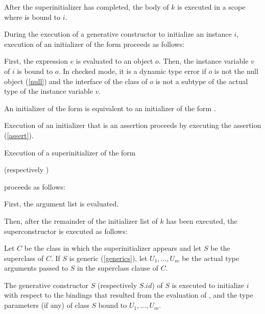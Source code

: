 \documentclass{article}
\begin{document}
\LMHash{}
After the superinitializer has completed, the body of $k$ is executed in a scope where \THIS{} is bound to $i$.


\LMHash{}
During the execution of a generative constructor to initialize an instance $i$,
execution of an initializer of the form 
proceeds as follows:

\LMHash{}
First, the expression $e$ is evaluated to an object $o$.
Then, the instance variable $v$ of $i$ is bound to $o$.
In checked mode, it is a dynamic type error if $o$ is not the null object (\ref{null}) and the interface of the class of $o$ is not a subtype of the actual type of the instance variable $v$.

\LMHash{}
An initializer of the form  is equivalent to an initializer of the form .

\LMHash{}
Execution of an initializer that is an assertion proceeds by executing the assertion (\ref{assert}).

\LMHash{}
Execution of a superinitializer of the form


(respectively
)

proceeds as follows:

\LMHash{}
First, the argument list
is evaluated.

\LMHash{}
Then, after the remainder of the initializer list of $k$ has been executed,
the superconstructor is executed as follows:

\LMHash{}
Let $C$ be the class in which the superinitializer appears and let $S$ be the superclass of $C$.
If $S$ is generic (\ref{generics}), let $U_1, \ldots, U_m$ be the actual type arguments passed to $S$ in the superclass clause of $C$.

\LMHash{}
The generative constructor $S$ (respectively $S.id$) of $S$ is executed
to initialize $i$ with respect to the bindings that resulted from the evaluation of
,
and the type parameters (if any) of class $S$ bound to $U_1, \ldots, U_m$.
\end{document}
